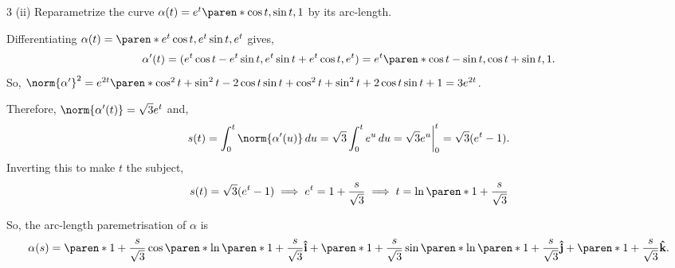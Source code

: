 \documentclass[11pt]{penrose}
\begin{document}
\begin{problem}{3 (ii)}
    Reparametrize the curve $\alpha(t) = e^{t}\paren*{\cos t, \sin t, 1}$ by its arc-length.

    \solution Differentiating $\alpha(t) = \paren*{e^t \cos t, e^t \sin t, e^t}$ gives,
    \begin{equation*}
        \alpha'(t) = (e^t \cos t - e^t \sin t, e^t \sin t + e^t \cos t, e^t) = e^t \paren*{\cos t - \sin t, \cos t + \sin t, 1}.
    \end{equation*}
    So, $\norm{\alpha'}^2 = e^{2t} \paren*{\cos^2 t + \sin^2 t - 2\cos t \sin t + \cos^2 t + \sin^2 t + 2\cos t \sin t + 1} = 3 e^{2t}$.

    Therefore, $\norm{\alpha'(t)} = \sqrt{3} e^t$ and,
    \begin{equation*}
        s(t)
        = \int_0^t \norm{\alpha'(u)} \,du
        = \sqrt{3} \int_0^t e^u \,du
        = \sqrt{3} e^u \bigg|_0^t
        = \sqrt{3} (e^t - 1).
    \end{equation*}
    Inverting this to make $t$ the subject,
    \begin{equation*}
        s(t) = \sqrt{3} (e^t - 1)
        \implies
        e^t = 1 + \frac{s}{\sqrt{3}}
        \implies
        t = \ln \paren*{1 + \frac{s}{\sqrt{3}}}
    \end{equation*}

    So, the arc-length paremetrisation of $\alpha$ is
    \begin{equation*}
        \alpha(s) = \paren*{1 + \frac{s}{\sqrt{3}}}\cos \paren*{\ln \paren*{1 + \frac{s}{\sqrt{3}}}} \uvec{i} + \paren*{1 + \frac{s}{\sqrt{3}}}\sin \paren*{\ln \paren*{1 + \frac{s}{\sqrt{3}}}} \uvec{j} + \paren*{1 + \frac{s}{\sqrt{3}}} \uvec{k}.
    \end{equation*}
\end{problem}
\end{document}
